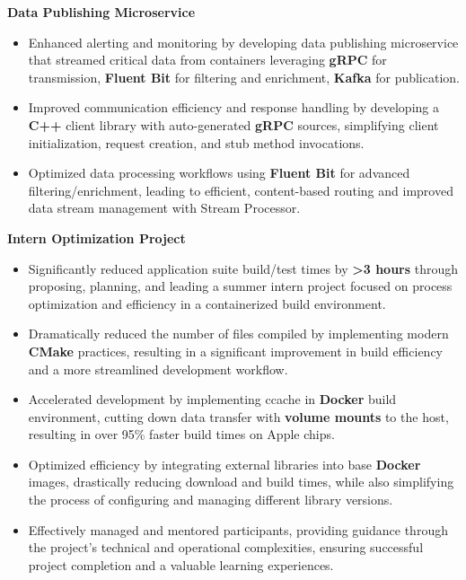 \documentclass[a4paper]{article}
\newcommand{\forceindent}{\leavevmode{\parindent=1em\indent}}
\begin{document}
\vspace{-1mm}
\forceindent \textbf{Data Publishing Microservice} \\
\vspace{-1mm}
\begin{itemize}
	\item Enhanced alerting and monitoring by developing data publishing microservice that streamed critical data from containers leveraging \textbf{gRPC} for transmission, \textbf{Fluent Bit} for filtering and enrichment, \textbf{Kafka} for publication.
	\item Improved communication efficiency and response handling by developing a \textbf{C++} client library with auto-generated \textbf{gRPC} sources, simplifying client initialization, request creation, and stub method invocations.
	\item Optimized data processing workflows using \textbf{Fluent Bit} for advanced filtering/enrichment, leading to efficient, content-based routing and improved data stream management with Stream Processor.
\end{itemize}
\vspace{-1mm}
\forceindent \textbf{Intern Optimization Project} \\
\vspace{-1mm}
\begin{itemize}
	\item Significantly reduced application suite build/test times by \textbf{>3 hours} through proposing, planning, and leading a summer intern project focused on process optimization and efficiency in a containerized build environment.
	\item Dramatically reduced the number of files compiled by implementing modern \textbf{CMake} practices, resulting in a significant improvement in build efficiency and a more streamlined development workflow.
	\item Accelerated development by implementing ccache in \textbf{Docker} build environment, cutting down data transfer with \textbf{volume mounts} to the host, resulting in over 95\% faster build times on Apple chips.
	\item Optimized efficiency by integrating external libraries into base \textbf{Docker} images, drastically reducing download and build times, while also simplifying the process of configuring and managing different library versions.
	\item Effectively managed and mentored participants, providing guidance through the project's technical and operational complexities, ensuring successful project completion and a valuable learning experiences.
\end{itemize}
\end{document}
